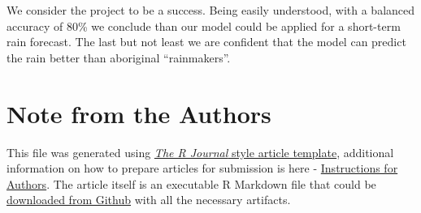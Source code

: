 We consider the project to be a success. Being easily understood, with a
balanced accuracy of 80\% we conclude than our model could be applied
for a short-term rain forecast. The last but not least we are confident
that the model can predict the rain better than aboriginal
``rainmakers''.



\newpage

\hypertarget{note-from-the-authors}{%
\section{Note from the Authors}\label{note-from-the-authors}}

This file was generated using
\href{https://github.com/rstudio/rticles}{\emph{The R Journal} style
article template}, additional information on how to prepare articles for
submission is here -
\href{https://journal.r-project.org/share/author-guide.pdf}{Instructions
for Authors}. The article itself is an executable R Markdown file that
could be
\href{https://github.com/ivbsoftware/big-data-final-2/blob/master/docs/R_Journal/big-data-final-2/}{downloaded
from Github} with all the necessary artifacts.


\address{%
Sumaira Afzal\\
York University School of Continuing Studies\\
\\
}


\address{%
Viraja Ketkar\\
York University School of Continuing Studies\\
\\
}


\address{%
Murlidhar Loka\\
York University School of Continuing Studies\\
\\
}


\address{%
Vadim Spirkov\\
York University School of Continuing Studies\\
\\
}


